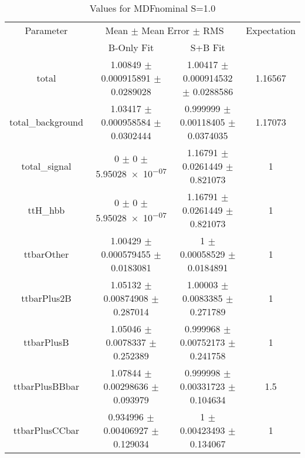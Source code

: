 \begin{table}
\centering
\caption{Values for MDFnominal S=1.0}
\begin{tabular}{cccc}
\toprule
Parameter & \multicolumn{2}{c}{Mean $\pm$ Mean Error $\pm$ RMS} & Expectation\\
 & B-Only Fit & S+B Fit & \\
\midrule
total & \num{1.00849} $\pm$ \num{0.000915891} $\pm$ \num{0.0289028} & \num{1.00417} $\pm$ \num{0.000914532} $\pm$ \num{0.0288586} & \num{1.16567}\\
total\_background & \num{1.03417} $\pm$ \num{0.000958584} $\pm$ \num{0.0302444} & \num{0.999999} $\pm$ \num{0.00118405} $\pm$ \num{0.0374035} & \num{1.17073}\\
total\_signal & \num{0} $\pm$ \num{0} $\pm$ \num{5.95028e-07} & \num{1.16791} $\pm$ \num{0.0261449} $\pm$ \num{0.821073} & \num{1}\\
ttH\_hbb & \num{0} $\pm$ \num{0} $\pm$ \num{5.95028e-07} & \num{1.16791} $\pm$ \num{0.0261449} $\pm$ \num{0.821073} & \num{1}\\
ttbarOther & \num{1.00429} $\pm$ \num{0.000579455} $\pm$ \num{0.0183081} & \num{1} $\pm$ \num{0.00058529} $\pm$ \num{0.0184891} & \num{1}\\
ttbarPlus2B & \num{1.05132} $\pm$ \num{0.00874908} $\pm$ \num{0.287014} & \num{1.00003} $\pm$ \num{0.0083385} $\pm$ \num{0.271789} & \num{1}\\
ttbarPlusB & \num{1.05046} $\pm$ \num{0.0078337} $\pm$ \num{0.252389} & \num{0.999968} $\pm$ \num{0.00752173} $\pm$ \num{0.241758} & \num{1}\\
ttbarPlusBBbar & \num{1.07844} $\pm$ \num{0.00298636} $\pm$ \num{0.093979} & \num{0.999998} $\pm$ \num{0.00331723} $\pm$ \num{0.104634} & \num{1.5}\\
ttbarPlusCCbar & \num{0.934996} $\pm$ \num{0.00406927} $\pm$ \num{0.129034} & \num{1} $\pm$ \num{0.00423493} $\pm$ \num{0.134067} & \num{1}\\
\bottomrule
\end{tabular}
\end{table}